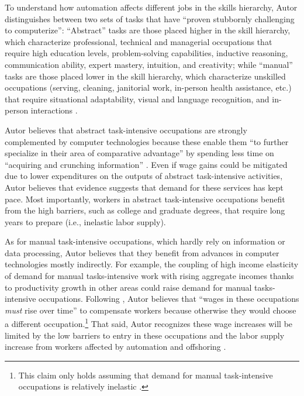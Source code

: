 \documentclass[version=last,draft=false,paper=A4,portrait,twoside=true,twocolumn=false,headinclude=false,footinclude=false,mpinclude=true,fontsize=12,BCOR=20mm,DIV=calc,pagesize=auto,open=right,chapterprefix=true,numbers=autoendperiod,headsepline=false,headings=twolinechapter,parskip=false]{scrbook}
\begin{document}
To understand how automation affects different jobs in the skills
hierarchy, Autor distinguishes between two sets of tasks that have ``proven
stubbornly challenging to computerize'': ``Abstract'' tasks are those
placed higher in the skill hierarchy, which characterize professional,
technical and managerial occupations that require high education levels,
problem-solving capabilities, inductive reasoning, communication ability,
expert mastery, intuition, and creativity; while ``manual'' tasks are those
placed lower in the skill hierarchy, which characterize unskilled
occupations (serving, cleaning, janitorial work, in-person health
assistance, etc.) that require situational adaptability, visual and
language recognition, and in-person interactions \autocite[p.
9]{autor2015}.

Autor believes that abstract task-intensive occupations are strongly
complemented by computer technologies because these enable them ``to
further specialize in their area of comparative advantage'' by spending
less time on ``acquiring and crunching information''
\autocite[15]{autor2015}. Even if wage gains could be mitigated due to
lower expenditures on the outputs of abstract task-intensive activities,
Autor believes that evidence suggests that demand for these services has
kept pace. Most importantly, workers in abstract task-intensive occupations
benefit from the high barriers, such as college and graduate degrees, that
require long years to prepare (i.e., inelastic labor supply).

As for manual task-intensive occupations, which hardly rely on information
or data processing, Autor believes that they benefit from advances in
computer technologies mostly indirectly. For example, the coupling of high
income elasticity of demand for manual tasks-intensive work with rising
aggregate incomes thanks to productivity growth in other areas could raise
demand for manual tasks-intensive occupations. Following
\textcite{baumol1967}, Autor believes that ``wages in these occupations \emph{must}
rise over time'' to compensate workers because otherwise they would choose
a different occupation.\footnote{This claim only holds assuming that demand for manual task-intensive
occupations is relatively inelastic \autocite[17]{autor2015}.} That said, Autor recognizes these wage
increases will be limited by the low barriers to entry in these occupations
and the labor supply increase from workers affected by automation and
offshoring \autocite[17]{autor2015}.
\end{document}
